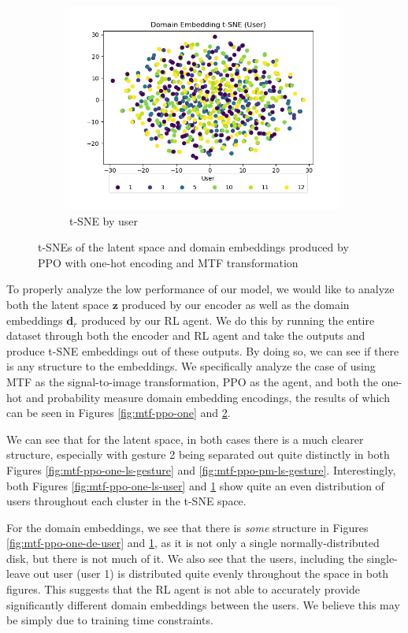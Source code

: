\begin{figure}
\begin{subfigure}{0.3\textwidth}
		\includegraphics[width=\textwidth]{figures/mtf-ppo-pm/de-user}
		\caption{t-SNE by user}
		\label{fig:mtf-ppo-pm-de-user}
	\end{subfigure}
	\caption{t-SNEs of the latent space and domain embeddings produced by PPO with one-hot encoding and MTF transformation}
	\label{fig:mtf-ppo-pm}
\end{figure}

To properly analyze the low performance of our model, we would like to analyze both the latent space $\boldsymbol{z}$ produced by our encoder as well as the domain embeddings $\boldsymbol{d}_{r}$ produced by our RL agent.
We do this by running the entire dataset through both the encoder and RL agent and take the outputs and produce t-SNE embeddings out of these outputs.
By doing so, we can see if there is any structure to the embeddings.
We specifically analyze the case of using MTF as the signal-to-image transformation, PPO as the agent, and both the one-hot and probability measure domain embedding encodings, the results of which can be seen in Figures \ref{fig:mtf-ppo-one} and \ref{fig:mtf-ppo-pm}.

We can see that for the latent space, in both cases there is a much clearer structure, especially with gesture 2 being separated out quite distinctly in both Figures \ref{fig:mtf-ppo-one-ls-gesture} and \ref{fig:mtf-ppo-pm-ls-gesture}. 
Interestingly, both Figures \ref{fig:mtf-ppo-one-ls-user} and \ref{fig:mtf-ppo-pm-de-user} show quite an even distribution of users throughout each cluster in the t-SNE space.

For the domain embeddings, we see that there is \textit{some} structure in Figures \ref{fig:mtf-ppo-one-de-user} and \ref{fig:mtf-ppo-pm-de-user}, as it is not only a single normally-distributed disk, but there is not much of it.
We also see that the users, including the single-leave out user (user 1) is distributed quite evenly throughout the space in both figures.
This suggests that the RL agent is not able to accurately provide significantly different domain embeddings between the users.
We believe this may be simply due to training time constraints.

